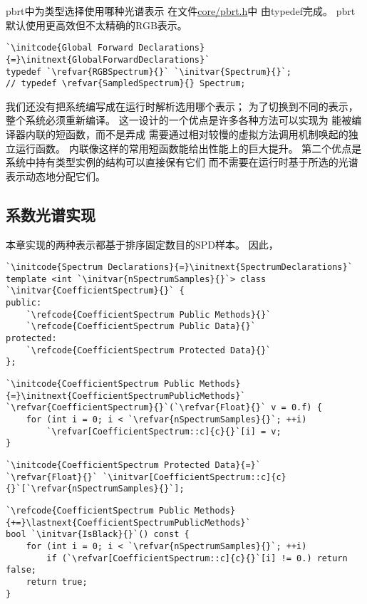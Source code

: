 pbrt中为类型选择使用哪种光谱表示
在文件\href{https://github.com/mmp/pbrt-v3/blob/master/src/core/pbrt.h}{\ttfamily core/pbrt.h}中
由{\ttfamily typedef}完成。
pbrt默认使用更高效但不太精确的RGB表示。
\begin{lstlisting}
`\initcode{Global Forward Declarations}{=}\initnext{GlobalForwardDeclarations}`
typedef `\refvar{RGBSpectrum}{}` `\initvar{Spectrum}{}`;
// typedef \refvar{SampledSpectrum}{} Spectrum;
\end{lstlisting}

我们还没有把系统编写成在运行时解析选用哪个表示；
为了切换到不同的表示，整个系统必须重新编译。
这一设计的一个优点是许多各种方法可以实现为
能被编译器内联的短函数，而不是弄成
需要通过相对较慢的虚拟方法调用机制唤起的独立运行函数。
内联像这样的常用短函数能给出性能上的巨大提升。
第二个优点是系统中持有类型实例的结构可以直接保有它们
而不需要在运行时基于所选的光谱表示动态地分配它们。

\subsection{系数光谱实现}\label{sub:系数光谱实现}
本章实现的两种表示都基于排序固定数目的SPD样本。
因此，
\begin{lstlisting}
`\initcode{Spectrum Declarations}{=}\initnext{SpectrumDeclarations}`
template <int `\initvar{nSpectrumSamples}{}`> class `\initvar{CoefficientSpectrum}{}` {
public:
    `\refcode{CoefficientSpectrum Public Methods}{}`
    `\refcode{CoefficientSpectrum Public Data}{}`
protected:
    `\refcode{CoefficientSpectrum Protected Data}{}`
};
\end{lstlisting}

\begin{lstlisting}
`\initcode{CoefficientSpectrum Public Methods}{=}\initnext{CoefficientSpectrumPublicMethods}`
`\refvar{CoefficientSpectrum}{}`(`\refvar{Float}{}` v = 0.f) {
    for (int i = 0; i < `\refvar{nSpectrumSamples}{}`; ++i)
        `\refvar[CoefficientSpectrum::c]{c}{}`[i] = v;
}
\end{lstlisting}

\begin{lstlisting}
`\initcode{CoefficientSpectrum Protected Data}{=}`
`\refvar{Float}{}` `\initvar[CoefficientSpectrum::c]{c}{}`[`\refvar{nSpectrumSamples}{}`];
\end{lstlisting}

\begin{lstlisting}
`\refcode{CoefficientSpectrum Public Methods}{+=}\lastnext{CoefficientSpectrumPublicMethods}`
bool `\initvar{IsBlack}{}`() const {
    for (int i = 0; i < `\refvar{nSpectrumSamples}{}`; ++i)
        if (`\refvar[CoefficientSpectrum::c]{c}{}`[i] != 0.) return false;
    return true;
}
\end{lstlisting}